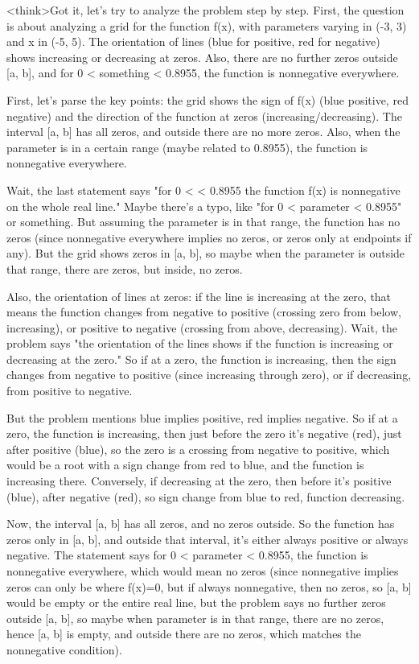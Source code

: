 <think>Got it, let's try to analyze the problem step by step. First, the question is about analyzing a grid for the function f(x), with parameters varying in (-3, 3) and x in (-5, 5). The orientation of lines (blue for positive, red for negative) shows increasing or decreasing at zeros. Also, there are no further zeros outside [a, b], and for 0 < something < 0.8955, the function is nonnegative everywhere. 

First, let's parse the key points: the grid shows the sign of f(x) (blue positive, red negative) and the direction of the function at zeros (increasing/decreasing). The interval [a, b] has all zeros, and outside there are no more zeros. Also, when the parameter is in a certain range (maybe related to 0.8955), the function is nonnegative everywhere. 

Wait, the last statement says "for 0 < < 0.8955 the function f(x) is nonnegative on the whole real line." Maybe there's a typo, like "for 0 < parameter < 0.8955" or something. But assuming the parameter is in that range, the function has no zeros (since nonnegative everywhere implies no zeros, or zeros only at endpoints if any). But the grid shows zeros in [a, b], so maybe when the parameter is outside that range, there are zeros, but inside, no zeros. 

Also, the orientation of lines at zeros: if the line is increasing at the zero, that means the function changes from negative to positive (crossing zero from below, increasing), or positive to negative (crossing from above, decreasing). Wait, the problem says "the orientation of the lines shows if the function is increasing or decreasing at the zero." So if at a zero, the function is increasing, then the sign changes from negative to positive (since increasing through zero), or if decreasing, from positive to negative. 

But the problem mentions blue implies positive, red implies negative. So if at a zero, the function is increasing, then just before the zero it's negative (red), just after positive (blue), so the zero is a crossing from negative to positive, which would be a root with a sign change from red to blue, and the function is increasing there. Conversely, if decreasing at the zero, then before it's positive (blue), after negative (red), so sign change from blue to red, function decreasing. 

Now, the interval [a, b] has all zeros, and no zeros outside. So the function has zeros only in [a, b], and outside that interval, it's either always positive or always negative. The statement says for 0 < parameter < 0.8955, the function is nonnegative everywhere, which would mean no zeros (since nonnegative implies zeros can only be where f(x)=0, but if always nonnegative, then no zeros, so [a, b] would be empty or the entire real line, but the problem says no further zeros outside [a, b], so maybe when parameter is in that range, there are no zeros, hence [a, b] is empty, and outside there are no zeros, which matches the nonnegative condition). 

